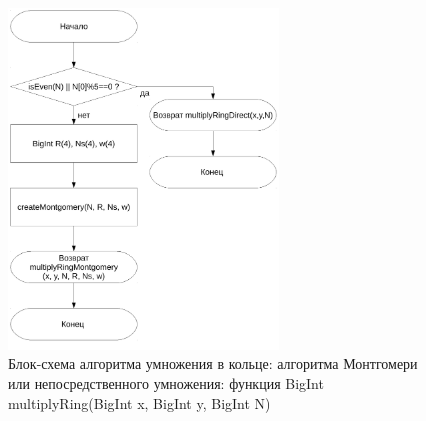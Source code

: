 \documentclass[a4paper,12pt]{article} %
\begin{document}
\begin{figure}[ht]
	\centering
	\includegraphics[width=0.64\textwidth]{lr5_multiplyRing.pdf}
	\caption{
		Блок-схема алгоритма умножения в кольце: алгоритма Монтгомери или непосредственного умножения:
		функция BigInt multiplyRing(BigInt x, BigInt y, BigInt N)
	}
	\label{bs_lr5_multiplyRing}
\end{figure}
\end{document}
